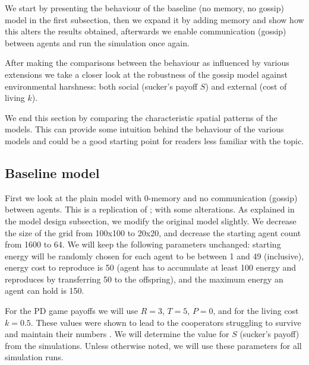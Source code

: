 \documentclass[english]{article}
\begin{document}
We start by presenting the behaviour of the baseline (no memory, no gossip) model in the first subsection,
then we expand it by adding memory and show how this alters the results obtained,
afterwards we enable communication (gossip) between agents and run the simulation once again.

After making the comparisons between the behaviour as influenced by various extensions we take a closer look at the robustness of the gossip model against environmental harshness: both social (sucker's payoff $S$) and external (cost of living $k$).

We end this section by comparing the characteristic spatial patterns of the models.
This can provide some intuition behind the behaviour of the various models and
could be a good starting point for readers less familiar with the topic.


\subsection{Baseline model}
First we look at the plain model with 0-memory and no communication (gossip) between agents.
This is a replication of \citet{smaldino}; with some alterations.
As explained in the model design subsection, we modify the original model slightly.
We decrease the size of the grid from 100x100 to 20x20,
and decrease the starting agent count from 1600 to 64.
We will keep the following parameters unchanged:
starting energy will be randomly chosen for each agent to be between 1 and 49 (inclusive),
energy cost to reproduce is 50 (agent has to accumulate at least 100 energy and reproduces by transferring 50 to the offspring),
and the maximum energy an agent can hold is 150.

For the PD game payoffs we will use $R = 3$, $T = 5$, $P = 0$,
and for the living cost $k = 0.5$.
These values were shown to lead to the cooperators struggling to survive
and maintain their numbers \citep{smaldino}.
We will determine the value for $S$ (sucker's payoff) from the simulations.
Unless otherwise noted, we will use these parameters for all simulation runs.
\end{document}
